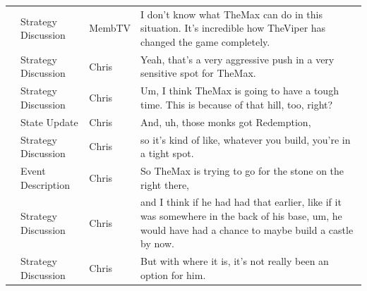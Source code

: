 {\begin{longtable}{@{}>{\theAppRow}r|L{2.3cm}L{1.0cm}U{11.55cm}@{}}
    & Strategy Discussion   & MembTV       & I don't know what TheMax can do in this situation. It's incredible how TheViper has changed the game completely.                                                                                                                                                 \\
    & Strategy Discussion   & Chris        & Yeah, that's a very aggressive push in a very sensitive spot for TheMax.                                                                                                                                                                                         \\
    & Strategy Discussion   & Chris        & Um, I think TheMax is going to have a tough time. This is because of that hill, too, right?                                                                                                                                                                      \\
    & State Update          & Chris        & And, uh, those monks got Redemption,                                                                                                                                                                                                                             \\
    & Strategy Discussion   & Chris        & so it's kind of like, whatever you build, you're in a tight spot.                                                                                                                                                                                                \\
    & Event Description     & Chris        & So TheMax is trying to go for the stone on the right there,                                                                                                                                                                                                      \\
    & Strategy Discussion   & Chris        & and I think if he had had that earlier, like if it was somewhere in the back of his base, um, he would have had a chance to maybe build a castle by now.                                                                                                         \\
    & Strategy Discussion   & Chris        & But with where it is, it's not really been an option for him.                                                                                                                                                                                                    \\

\end{longtable}}
